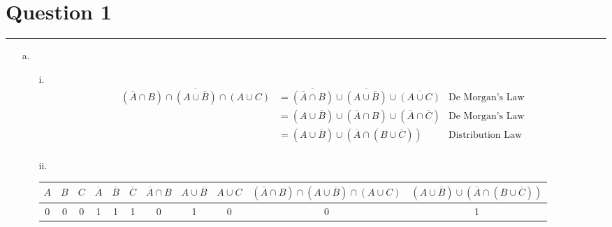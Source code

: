 \documentclass{article}
\begin{document}
\newcommand{\documentcourse}{COMP2121}
\newcommand{\documentnumber}{2}





\section*{Question 1}
\hrule
\vspace{0.5cm}
\begin{enumerate}
    \item[a.] \begin{enumerate}
              \item[i.] \[\begin{aligned}
                            \overline{(\overline{A}\cap B)\cap(A\cup\overline{B})\cap(A\cup C)} & = \overline{(\overline{A}\cap B)}\cup\overline{(A\cup\overline{B})}\cup\overline{(A\cup C)} & \text{De Morgan's Law}  \\
                                                                                                & = (A\cup\overline{B})\cup(\overline{A}\cap B)\cup(\overline{A}\cap\overline{C})             & \text{De Morgan's Law}  \\
                                                                                                & = (A\cup\overline{B})\cup(\overline{A}\cap(B\cup\overline{C}))                              & \text{Distribution Law} \\
                        \end{aligned}\]
              \item [ii.]
                    \begin{center}
                        \centering
                        \begin{tabular}{|c|c|c|c|c|c|c|c|c|c|c|}
                            \hline
                            $A$ & $B$ & $C$ & $\overline{A}$ & $\overline{B}$ & $\overline{C}$ & $\overline{A} \cap B$ & $A \cup \overline{B}$ & $A \cup C$ & $(\overline{A} \cap B) \cap (A \cup \overline{B}) \cap (A \cup C)$ & $(A \cup \overline{B}) \cup (\overline{A} \cap (B \cup \overline{C}))$ \\ \hline
                            0   & 0   & 0   & 1              & 1              & 1              & 0                     & 1                     & 0          & 0                                                                  & 1                                                                      \\ \hline

\end{tabular}
\end{center}
\end{enumerate}
\end{enumerate}
\end{document}
